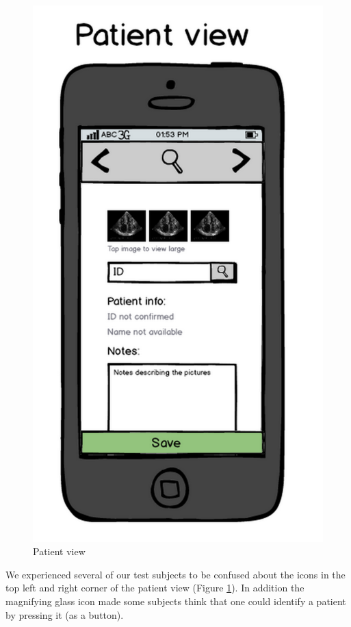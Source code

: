 \begin{figure}[H]
\centering
\includegraphics[scale=0.20]{img/mockups/patient_view.png}
\caption{Patient view}
\label{patientmock}
\end{figure}
We experienced several of our test subjects to be confused about the icons in the top left and right corner of the patient view (Figure \ref{patientmock}). In addition the magnifying glass icon made some subjects think that one could identify a patient by pressing it (as a button). 

